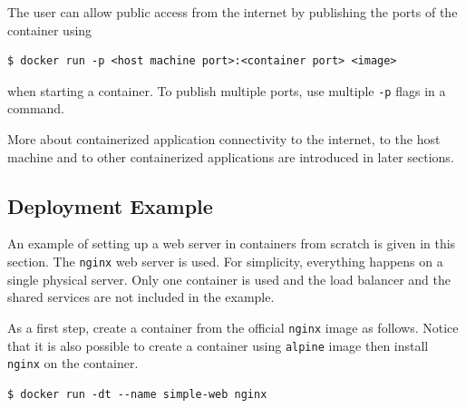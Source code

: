 The user can allow public access from the internet by publishing the ports of the container using
\begin{lstlisting}
$ docker run -p <host machine port>:<container port> <image>
\end{lstlisting}
when starting a container. To publish multiple ports, use multiple \verb|-p| flags in a command.

More about containerized application connectivity to the internet, to the host machine and to other containerized applications are introduced in later sections.

\subsection{Deployment Example}

An example of setting up a web server in containers from scratch is given in this section. The \verb|nginx| web server is used. For simplicity, everything happens on a single physical server. Only one container is used and the load balancer and the shared services are not included in the example.

As a first step, create a container from the official \verb|nginx| image as follows. Notice that it is also possible to create a container using \verb|alpine| image then install \verb|nginx| on the container.
\begin{lstlisting}
$ docker run -dt --name simple-web nginx
\end{lstlisting}

